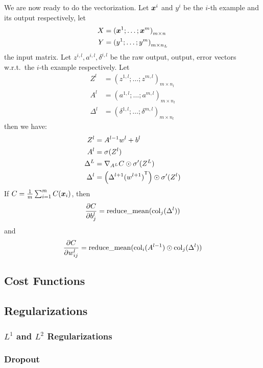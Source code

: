 We are now ready to do the vectorization. Let $\boldsymbol{x}^i$ and $y^i$
be the $i$-th example and its output respectively, let
\begin{align*}
    X &= {(\boldsymbol{x}^1; \ldots; \boldsymbol{x}^m)}_{m \times n}\\
    Y &= {(y^1; \ldots; y^m)}_{m \times n_L}
\end{align*}
the input matrix. 
Let $z^{i, l}, a^{i, l}, \delta^{i, l}$ be the raw output, output, error vectors w.r.t.\ the
$i$-th example respectively. Let 
\begin{align*}
    Z^l &= {(z^{1, l}; \ldots; z^{m, l})}_{m \times n_l}\\
    A^l &= {(a^{1, l}; \ldots; a^{m, l})}_{m \times n_l}\\
    \Delta^l &= {(\delta^{1, l}; \ldots; \delta^{m, l})}_{m \times n_l}
\end{align*}
then we have:
\begin{align}
    Z^l &= A^{l-1} w^l + b^l\\
    A^l &= \sigma(Z^l)\\
    \Delta^L &= \nabla_{A^L}C \odot \sigma'(Z^L)\\
    \Delta^l &= \left(\Delta^{l+1} {(w^{l+1})}^\mathsf{T}\right) \odot \sigma'(Z^l)
\end{align}
If $C = \frac{1}{m}\sum_{i=1}^m C(\boldsymbol{x}_i)$, then
$$\frac{\partial {C}}{\partial {b^l_j}} = \operatorname{reduce\_mean}(\operatorname{col}_j(\Delta^l))$$
and
$$\frac{\partial {C}}{\partial {w^l_{ij}}} = \operatorname{reduce\_mean}(\operatorname{col}_i(A^{l-1}) \odot \operatorname{col}_j
(\Delta^l))$$

\subsection{Cost Functions}

\subsection{Regularizations}
\subsubsection{$L^1$ and $L^2$ Regularizations}

\subsubsection{Dropout}